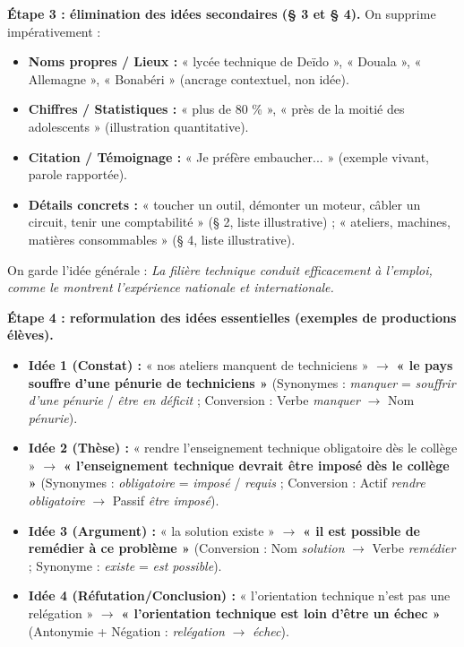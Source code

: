 \documentclass[11pt]{article}
\begin{document}
\begin{exoresolu}
\textbf{Étape 3 : élimination des idées secondaires (§ 3 et § 4).}
On supprime impérativement :
\begin{itemize}
\item \textbf{Noms propres / Lieux :} « lycée technique de Deïdo », « Douala », « Allemagne », « Bonabéri » (ancrage contextuel, non idée).
\item \textbf{Chiffres / Statistiques :} « plus de 80 \% », « près de la moitié des adolescents » (illustration quantitative).
\item \textbf{Citation / Témoignage :} « Je préfère embaucher... » (exemple vivant, parole rapportée).
\item \textbf{Détails concrets :} « toucher un outil, démonter un moteur, câbler un circuit, tenir une comptabilité » (§ 2, liste illustrative) ; « ateliers, machines, matières consommables » (§ 4, liste illustrative).
\end{itemize}
On garde l'idée générale : \emph{La filière technique conduit efficacement à l'emploi, comme le montrent l'expérience nationale et internationale.}

\textbf{Étape 4 : reformulation des idées essentielles (exemples de productions élèves).}
\begin{itemize}
\item \textbf{Idée 1 (Constat) :} « nos ateliers manquent de techniciens » $\rightarrow$ \textbf{« le pays souffre d'une pénurie de techniciens »} (Synonymes : \emph{manquer} = \emph{souffrir d'une pénurie} / \emph{être en déficit} ; Conversion : Verbe \emph{manquer} $\rightarrow$ Nom \emph{pénurie}).
\item \textbf{Idée 2 (Thèse) :} « rendre l'enseignement technique obligatoire dès le collège » $\rightarrow$ \textbf{« l'enseignement technique devrait être imposé dès le collège »} (Synonymes : \emph{obligatoire} = \emph{imposé} / \emph{requis} ; Conversion : Actif \emph{rendre obligatoire} $\rightarrow$ Passif \emph{être imposé}).
\item \textbf{Idée 3 (Argument) :} « la solution existe » $\rightarrow$ \textbf{« il est possible de remédier à ce problème »} (Conversion : Nom \emph{solution} $\rightarrow$ Verbe \emph{remédier} ; Synonyme : \emph{existe} = \emph{est possible}).
\item \textbf{Idée 4 (Réfutation/Conclusion) :} « l'orientation technique n'est pas une relégation » $\rightarrow$ \textbf{« l'orientation technique est loin d'être un échec »} (Antonymie + Négation : \emph{relégation} $\rightarrow$ \emph{échec}).
\end{itemize}


\end{exoresolu}
\end{document}
